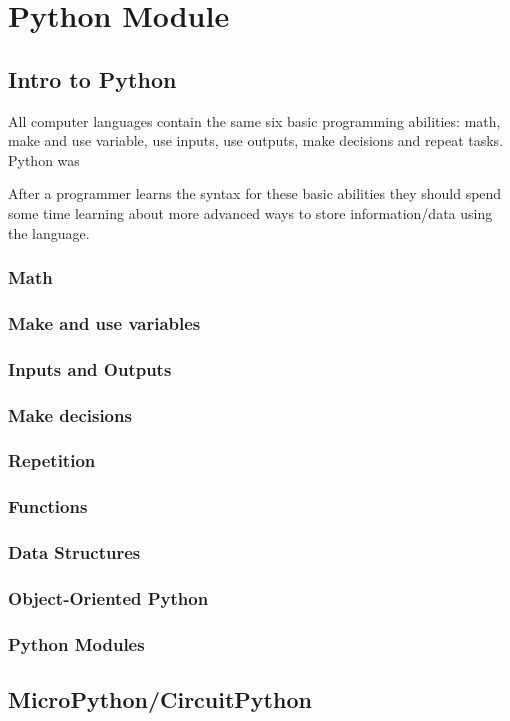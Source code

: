 \chapter{Python Module}
 
\section{Intro to Python}
All computer languages contain the same six basic programming abilities: math, make and use variable, use inputs, use outputs, make decisions and repeat tasks.  Python was 

After a programmer learns the syntax for these basic abilities they should spend some time learning about more advanced ways to store information/data using the language.



\subsection{Math}
\subsection{Make and use variables}
\subsection{Inputs and Outputs}
\subsection{Make decisions}
\subsection{Repetition}
\subsection{Functions}
\subsection{Data Structures}
\subsection{Object-Oriented Python}
\subsection{Python Modules}

\section{MicroPython/CircuitPython}


%
%


\vfill
